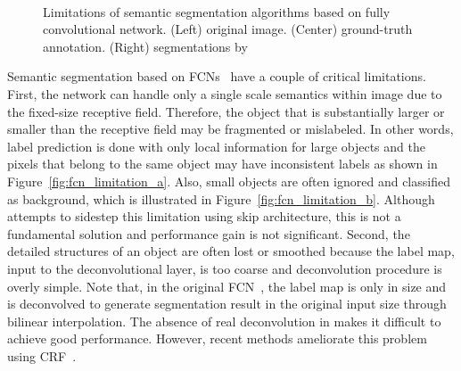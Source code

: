\documentclass[10pt,twocolumn,letterpaper]{article}
\begin{document}
\begin{figure}[t]
\centering
{} \\ \vspace{-0.2cm}
\caption{Limitations of semantic segmentation algorithms based on fully convolutional network. (Left) original image. (Center) ground-truth annotation. (Right) segmentations by \cite{Fcn} }
\label{fig:fcn_limitation}
\end{figure}
Semantic segmentation based on FCNs~\cite{Deeplabcrf,Fcn} have a couple of critical limitations.
First, the network can handle only a single scale semantics within image due to the fixed-size receptive field.
Therefore, the object that is substantially larger or smaller than the receptive field may be fragmented or mislabeled.
In other words, label prediction is done with only local information for large objects and the pixels that belong to the same object may have inconsistent labels as shown in Figure~\ref{fig:fcn_limitation_a}.
Also, small objects are often ignored and classified as background, which is illustrated in Figure~\ref{fig:fcn_limitation_b}.
Although \cite{Fcn} attempts to sidestep this limitation using skip architecture, this is not a fundamental solution and performance gain is not significant.
Second, the detailed structures of an object are often lost or smoothed because the label map, input to the deconvolutional layer, is too coarse and deconvolution procedure is overly simple.
Note that, in the original FCN~\cite{Fcn}, the label map is only  in size and is deconvolved to generate segmentation result in the original input size through bilinear interpolation.
The absence of real deconvolution in \cite{Deeplabcrf,Fcn} makes it difficult to achieve good performance.
However, recent methods ameliorate this problem using CRF~\cite{Fullycrf}.

\iffalse
First is trade-off between accuracy and detail. 
Classification CNN generate single label prediction from input with single receptive field.
Therefore, to obtain the detail segmentation result, network have to predict every pixel of the object seperately.
This strategy forces the network to make prediction with local information only.
label the object without looking at the whole object but only looking at its part to obtain detail segmentation result,. 
Second is weakness in cluttered background or occluded object. It is very difficult to distinguish target object and cluttered background texture if we focusing on that part alone, because there might be almost no difference in their looking. 
\fi
\end{document}
